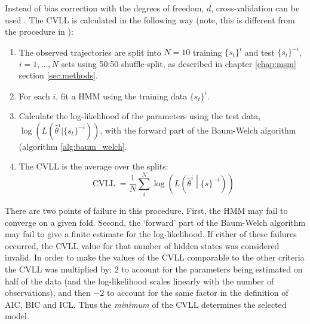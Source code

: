 Instead of bias correction with the degrees of freedom, $d$, cross-validation can be used  \cite{celeuxSelectingHiddenMarkov2008}. The CVLL is calculated in the following way (note, this is different from the procedure in \cite{celeuxSelectingHiddenMarkov2008}): 
\begin{enumerate}
    \item The observed trajectories are split into $N = 10$ training $\{s_t\}^{i}$ and test $\{s_t\}^{-i}$, $i = 1, ..., N$ sets using 50:50 shuffle-split, as described in chapter \ref{chap:msm} section \ref{sec:methods}. 
    \item For each $i$, fit a HMM using the training data $\{s_t\}^{i}$. \label{} 
    \item Calculate the log-likelihood of the parameters using the test data,  $\log{\left(L(\hat{\theta}^{i}|\{s_t\}^{-i})\right)}$, with the forward part of the Baum-Welch algorithm (algorithm \ref{alg:baum_welch}. 
    \item The CVLL is the average over the splits: 
    \begin{equation}
        \operatorname{CVLL} = \frac{1}{N}\sum_{i}^{N}\log{\left(L\left(\hat{\theta}^{i} \middle | \{s\}^{-i}\right)\right)}
    \end{equation}
\end{enumerate}
There are two points of failure in this procedure. First, the HMM may fail to converge on a given fold. Second, the `forward' part of the Baum-Welch algorithm may fail to give a finite estimate for the log-likelihood. If either of these failures occurred, the CVLL value for that number of hidden states was considered invalid.  In order to make the values of the CVLL comparable to the other criteria the CVLL was multiplied by: $2$ to account for the parameters being estimated on half of the data (and the log-likelihood scales linearly with the number of observations), and then $-2$ to account for the same factor in the definition of AIC, BIC and ICL. Thus the \emph{minimum} of the CVLL determines the selected model.

